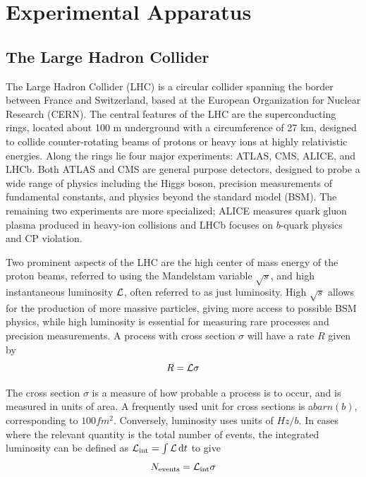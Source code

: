 
\chapter{Experimental Apparatus}
\label{chap:exp}

\section{The Large Hadron Collider} \label{sec:LHC}
The Large Hadron Collider (LHC) is a circular collider spanning the border between France and Switzerland, based at the European Organization for Nuclear Research (CERN). The central features of the LHC are the superconducting rings, located about 100 m underground with a circumference of 27 km, designed to collide counter-rotating beams of protons or heavy ions at highly relativistic energies. Along the rings lie four major experiments: ATLAS, CMS, ALICE, and LHCb. Both ATLAS and CMS are general purpose detectors, designed to probe a wide range of physics including the Higgs boson, precision measurements of fundamental constants, and physics beyond the standard model (BSM). The remaining two experiments are more specialized; ALICE measures quark gluon plasma produced in heavy-ion collisions and LHCb focuses on $b$-quark physics and CP violation.

Two prominent aspects of the LHC are the high center of mass energy of the proton beams, referred to using the Mandelstam variable $\sqrt{s}$, and high instantaneous luminosity $\mathcal{L}$, often referred to as just luminosity. High $\sqrt{s}$ allows for the production of more massive particles, giving more access to possible BSM physics, while high luminosity is essential for measuring rare processes and precision measurements. A process with cross section $\sigma$ will have a rate $R$ given by
\begin{equation}
	R=\mathcal{L}\sigma
\end{equation}

The cross section $\sigma$ is a measure of how probable a process is to occur, and is measured in units of area. A frequently used unit for cross sections is a$\unit{barn}\unit{(b)}$, corresponding to $100\unit{fm^2}$. Conversely, luminosity uses units of $\unit{Hz/b}$. In cases where the relevant quantity is the total number of events, the integrated luminosity can be defined as $\intlumi=\int{\lumi\dd{t}}$ to give
\begin{equation}
	N_\mathrm{events} = \mathcal{L}_\mathrm{int}\sigma
\end{equation}

